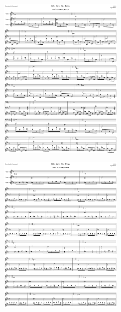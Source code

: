 \begin{figure}[H]                                             
{                                                             
  \setlength{\tabcolsep}{3.0pt}                               
  \setlength\cmidrulewidth{\heavyrulewidth} %
    \begin{subfigure}{0.5\textwidth}                            
  \includegraphics[width=6cm]{music/title_no_19_page_1001.png}%
    \end{subfigure}                                             
  \begin{subfigure}{0.5\textwidth}                            
  \includegraphics[width=6cm]{music/title_no_20_page_1001.png}%
    \end{subfigure}                                             
}                                                             
\end{figure}                                                  


